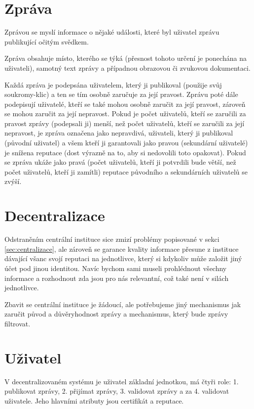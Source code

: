 \documentclass{report}
\begin{document}
\section{Zpráva}
\label{sec:zprava}

Zprávou se myslí informace o nějaké události, které byl uživatel zprávu publikující očitým svědkem.

Zpráva obsahuje místo, kterého se týká (přesnost tohoto určení je ponechána na uživateli), samotný text zprávy a případnou obrazovou či zvukovou dokumentaci.

Každá zpráva je podepsána uživatelem, který ji publikoval (použije svůj \gls{soukromy-klic}) a ten se tím osobně zaručuje za její pravost. Zprávu poté dále podepisují uživatelé, kteří se také mohou osobně zaručit za její pravost, zároveň se mohou zaručit za její nepravost. Pokud je počet uživatelů, kteří se zaručili za pravost zprávy (podepsali ji) menší, než počet uživatelů, kteří se zaručili za její nepravost, je zpráva označena jako nepravdivá, uživateli, který ji publikoval (původní uživatel) a všem kteří ji garantovali jako pravou (sekundární uživatelé) je snížena reputace (dost výrazně na to, aby si nedovolili toto opakovat). Pokud se zpráva ukáže jako pravá (počet uživatelů, kteří ji potvrdili bude větší, než počet uživatelů, kteří ji zamítli) reputace původního a sekundárních uživatelů se zvýší.

\section{Decentralizace}
\label{sec:decentralizace}
Odstraněním centrální instituce sice zmizí problémy popisované v sekci \ref{sec:centralizace}, ale zároveň se garance kvality informace přesune z instituce dávající všanc svojí reputaci na jednotlivce, který si kdykoliv může založit jiný účet pod jinou identitou. Navíc bychom sami museli prohlédnout všechny informace a rozhodnout zda jsou pro nás relevantní, což také není v silách jednotlivce. \citep{netanel01}

Zbavit se centrální instituce je žádoucí, ale potřebujeme jiný mechanismus jak zaručit původ a důvěryhodnost zprávy a mechanismus, který bude zprávy filtrovat.

\section{Uživatel}
\label{sec:uzivatel}
V decentralizovaném systému je uživatel základní jednotkou, má čtyři role: 1. publikovat zprávy, 2. přijímat zprávy, 3. validovat zprávy a za 4. validovat uživatele. Jeho hlavními atributy jsou certifikát a reputace.
\end{document}
